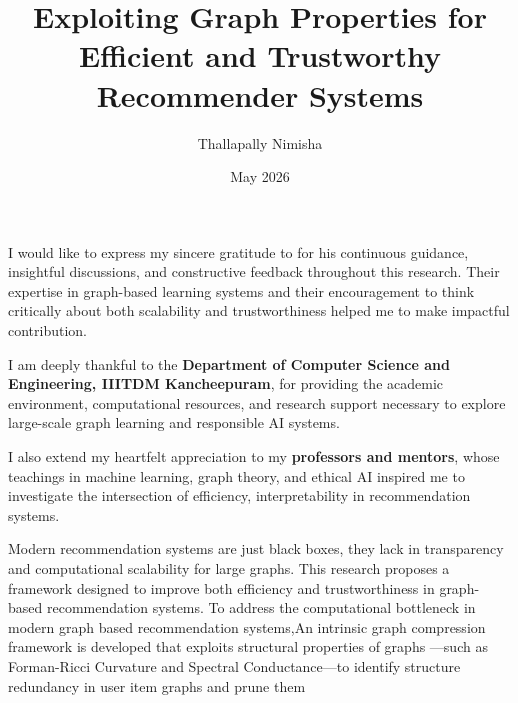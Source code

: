 \documentclass[BTech]{iiitdmdiss}
\begin{document}
\title{Exploiting Graph Properties for Efficient and Trustworthy Recommender Systems}
\author{Thallapally Nimisha}
\date{May 2026}

\maketitle

\declaration


\certificate
\acknowledgements

\makeatletter

I would like to express my sincere gratitude to {\bf \@guide} for his continuous guidance, insightful discussions, and constructive feedback throughout this research. Their expertise in graph-based learning systems and their encouragement to think critically about both scalability and trustworthiness helped me to make impactful contribution.

I am deeply thankful to the \textbf{Department of Computer Science and Engineering, IIITDM Kancheepuram}, for providing the academic environment, computational resources, and research support necessary to explore large-scale graph learning and responsible AI systems.

I also extend my heartfelt appreciation to my \textbf{professors and mentors}, whose teachings in machine learning, graph theory, and ethical AI inspired me to investigate the intersection of efficiency, interpretability in recommendation systems.


\makeatother
\abstract

Modern recommendation systems are just black boxes, they lack in transparency and computational scalability for large graphs. This research proposes a framework designed to improve both efficiency and trustworthiness in graph-based recommendation systems. To address the computational bottleneck in modern graph based recommendation systems,An intrinsic graph compression framework is developed that exploits structural properties of graphs —such as Forman-Ricci Curvature and Spectral Conductance—to identify structure redundancy in user item graphs and prune them
\end{document}
